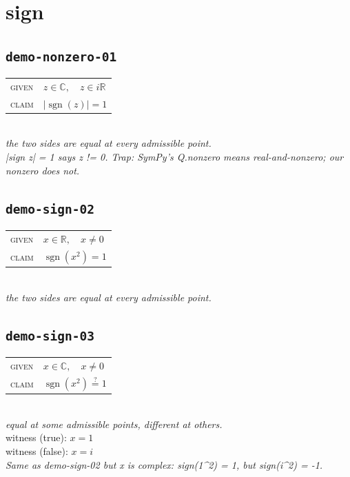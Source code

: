 \documentclass[11pt]{article}
\begin{document}
\section*{sign}
\subsection*{\texttt{demo-nonzero-01}}
\begin{tabular}{@{}l@{\quad}l@{}}
\textsc{given} & $z \in \mathbb{C},\quad z \in i\mathbb{R}$ \\[4pt]
\textsc{claim} & $\displaystyle \left|\operatorname{sgn}\left(z\right)\right| = 1$ \\
\end{tabular}\\[2pt]
{\small\emph{the two sides are equal at every admissible point.}}\\
\emph{|sign z| = 1 says z != 0.  Trap: SymPy's Q.nonzero means real-and-nonzero; our nonzero does not.}\\

\subsection*{\texttt{demo-sign-02}}
\begin{tabular}{@{}l@{\quad}l@{}}
\textsc{given} & $x \in \mathbb{R},\quad x \neq 0$ \\[4pt]
\textsc{claim} & $\displaystyle \operatorname{sgn}\left(x^{2}\right) = 1$ \\
\end{tabular}\\[2pt]
{\small\emph{the two sides are equal at every admissible point.}}\\

\subsection*{\texttt{demo-sign-03}}
\begin{tabular}{@{}l@{\quad}l@{}}
\textsc{given} & $x \in \mathbb{C},\quad x \neq 0$ \\[4pt]
\textsc{claim} & $\displaystyle \operatorname{sgn}\left(x^{2}\right) \overset{?}{=} 1$ \\
\end{tabular}\\[2pt]
{\small\emph{equal at some admissible points, different at others.}}\\
{\footnotesize\color{gray}witness (true): $x = 1$}\\
{\footnotesize\color{gray}witness (false): $x = i$}\\
\emph{Same as demo-sign-02 but x is complex: sign(1\textasciicircum{}2) = 1, but sign(i\textasciicircum{}2) = -1.}\\
\end{document}
